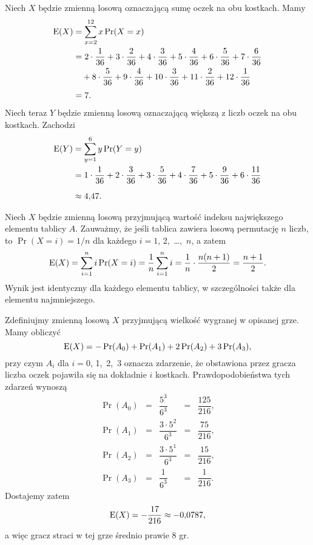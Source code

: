 
\exercise{} %
Niech $X$ będzie zmienną losową oznaczającą sumę oczek na obu kostkach. Mamy
\begin{align*}
	\operatorname{E}(X) &= \sum_{x=2}^{12}x\Pr(X=x) \\
	&= 2\cdot\frac{1}{36}+3\cdot\frac{2}{36}+4\cdot\frac{3}{36}+5\cdot\frac{4}{36}+6\cdot\frac{5}{36}+7\cdot\frac{6}{36} \\
	&\quad +8\cdot\frac{5}{36}+9\cdot\frac{4}{36}+10\cdot\frac{3}{36}+11\cdot\frac{2}{36}+12\cdot\frac{1}{36} \\[1mm]
	&= 7.
\end{align*}
Niech teraz $Y$ będzie zmienną losową oznaczającą większą z liczb oczek na obu kostkach. Zachodzi
\begin{align*}
	\operatorname{E}(Y) &= \sum_{y=1}^{6}y\Pr(Y=y) \\
	&= 1\cdot\frac{1}{36}+2\cdot\frac{3}{36}+3\cdot\frac{5}{36}+4\cdot\frac{7}{36}+5\cdot\frac{9}{36}+6\cdot\frac{11}{36} \\[2mm]
	&\approx 4{,}47.
\end{align*}

\exercise{} %
Niech $X$ będzie zmienną losową przyjmującą wartość indeksu największego elementu tablicy $A$. Zauważmy, że jeśli tablica zawiera losową permutację $n$ liczb, to $\Pr(X=i)=1/n$ dla każdego $i=1$, 2,~\dots,~$n$, a zatem
\[
	\operatorname{E}(X) = \sum_{i=1}^ni\Pr(X=i) = \frac{1}{n}\sum_{i=1}^ni = \frac{1}{n}\cdot\frac{n(n+1)}{2} = \frac{n+1}{2}.
\]
Wynik jest identyczny dla każdego elementu tablicy, w szczególności także dla elementu najmniejszego.

\exercise{} %
Zdefiniujmy zmienną losową $X$ przyjmującą wielkość wygranej w opisanej grze. Mamy obliczyć
\[
	\operatorname{E}(X) = -\Pr(A_0)+\Pr(A_1)+2\Pr(A_2)+3\Pr(A_3),
\]
przy czym $A_i$ dla $i=0$, 1,~2,~3 oznacza zdarzenie, że obstawiona przez gracza liczba oczek pojawiła się na dokładnie $i$ kostkach. Prawdopodobieństwa tych zdarzeń wynoszą
\[
	\begin{matrix}
	\Pr(A_0) &=& \dfrac{5^3}{6^3} &=& \dfrac{125}{216}, \\[3mm]
	\Pr(A_1) &=& \dfrac{3\cdot 5^2}{6^3} &=& \dfrac{75}{216}, \\[3mm]
	\Pr(A_2) &=& \dfrac{3\cdot 5^1}{6^3} &=& \dfrac{15}{216}, \\[3mm]
	\Pr(A_3) &=& \dfrac{1}{6^3} &=& \dfrac{1}{216}.
	\end{matrix}
\]
Dostajemy zatem
\[
	\operatorname{E}(X) = -\dfrac{17}{216} \approx -0{,}0787,
\]
a więc gracz straci w tej grze średnio prawie 8 gr.

